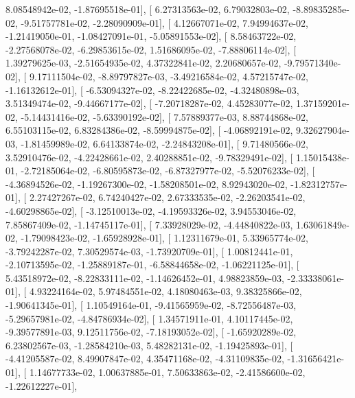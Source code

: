 \documentclass{article}
\begin{document}
          8.08548942e-02,  -1.87695518e-01],
       [  6.27313563e-02,   6.79032803e-02,  -8.89835285e-02,
         -9.51757781e-02,  -2.28090909e-01],
       [  4.12667071e-02,   7.94994637e-02,  -1.21419050e-01,
         -1.08427091e-01,  -5.05891553e-02],
       [  8.58463722e-02,  -2.27568078e-02,  -6.29853615e-02,
          1.51686095e-02,  -7.88806114e-02],
       [  1.39279625e-03,  -2.51654935e-02,   4.37322841e-02,
          2.20680657e-02,  -9.79571340e-02],
       [  9.17111504e-02,  -8.89797827e-03,  -3.49216584e-02,
          4.57215747e-02,  -1.16132612e-01],
       [ -6.53094327e-02,  -8.22422685e-02,  -4.32480898e-03,
          3.51349474e-02,  -9.44667177e-02],
       [ -7.20718287e-02,   4.45283077e-02,   1.37159201e-02,
         -5.14431416e-02,  -5.63390192e-02],
       [  7.57889377e-03,   8.88744868e-02,   6.55103115e-02,
          6.83284386e-02,  -8.59994875e-02],
       [ -4.06892191e-02,   9.32627904e-03,  -1.81459989e-02,
          6.64133874e-02,  -2.24843208e-01],
       [  9.71480566e-02,   3.52910476e-02,  -4.22428661e-02,
          2.40288851e-02,  -9.78329491e-02],
       [  1.15015438e-01,  -2.72185064e-02,  -6.80595873e-02,
         -6.87327977e-02,  -5.52076233e-02],
       [ -4.36894526e-02,  -1.19267300e-02,  -1.58208501e-02,
          8.92943020e-02,  -1.82312757e-01],
       [  2.27427267e-02,   6.74240427e-02,   2.67333535e-02,
         -2.26203541e-02,  -4.60298865e-02],
       [ -3.12510013e-02,  -4.19593326e-02,   3.94553046e-02,
          7.85867409e-02,  -1.14745117e-01],
       [  7.33928029e-02,  -4.44840822e-03,   1.63061849e-02,
         -1.79098423e-02,  -1.65928928e-01],
       [  1.12311679e-01,   5.33965774e-02,  -3.79242287e-02,
          7.30529574e-03,  -1.73920709e-01],
       [  1.00812441e-01,  -2.10713595e-02,  -1.25889187e-01,
         -6.58844658e-02,  -1.06221125e-01],
       [  5.43518972e-02,  -8.22833111e-02,  -1.14626452e-01,
          4.98823859e-03,  -2.33338061e-01],
       [  4.93224164e-02,   5.97484551e-02,   4.18080463e-03,
          9.38325866e-02,  -1.90641345e-01],
       [  1.10549164e-01,  -9.41565959e-02,  -8.72556487e-03,
         -5.29657981e-02,  -4.84786934e-02],
       [  1.34571911e-01,   4.10117445e-02,  -9.39577891e-03,
          9.12511756e-02,  -7.18193052e-02],
       [ -1.65920289e-02,   6.23802567e-03,  -1.28584210e-03,
          5.48282131e-02,  -1.19425893e-01],
       [ -4.41205587e-02,   8.49907847e-02,   4.35471168e-02,
         -4.31109835e-02,  -1.31656421e-01],
       [  1.14677733e-02,   1.00637885e-01,   7.50633863e-02,
         -2.41586600e-02,  -1.22612227e-01],
\end{document}
